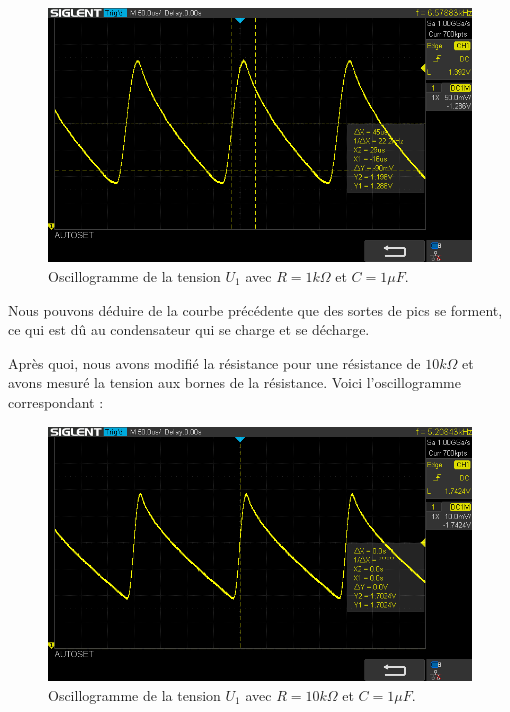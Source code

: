 \begin{figure}[H]
    \begin{center}
    \includegraphics[scale=0.5]{images/Oscillo/SDS00003.png}
    \caption{Oscillogramme de la tension $U_1$ avec $R=1k\Omega$ et $C=1\mu F$.}
    \end{center}
\end{figure}

Nous pouvons déduire de la courbe précédente que des sortes de pics se forment, ce qui est dû au condensateur qui se charge et se décharge.

Après quoi, nous avons modifié la résistance pour une résistance de $10k\Omega$ et avons mesuré la tension aux bornes de la résistance. Voici l'oscillogramme correspondant :
\begin{figure}[H]
    \begin{center}
    \includegraphics[scale=0.4]{images/Oscillo/SDS00004.png}
    \caption{Oscillogramme de la tension $U_1$ avec $R=10k\Omega$ et $C=1\mu F$.}
    \end{center}
\end{figure}


